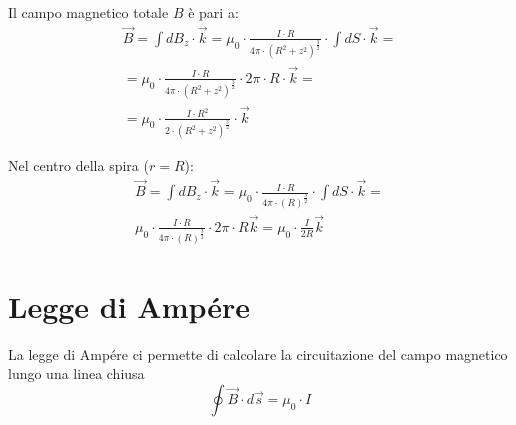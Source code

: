 Il campo magnetico totale $B$ è pari a:
\begin{displaymath}\begin{aligned}
	\vec{B} = \int dB_z \cdot \vec{k} =  \mu_0 \cdot \frac{I \cdot R}{4\pi \cdot (R^2 + z^2)^\frac{3}{2}} \cdot \int dS \cdot \vec{k} = \\
    = \mu_0 \cdot \frac{I \cdot R}{4\pi \cdot (R^2 + z^2)^\frac{3}{2}} \cdot 2 \pi \cdot R \cdot \vec{k} = \\
    =\mu_0 \cdot \frac{I \cdot R^2}{2 \cdot (R^2 + z^2)^\frac{3}{2}} \cdot \vec{k}
\end{aligned}\end{displaymath}

Nel centro della spira ($r=R$):
\begin{displaymath}\begin{aligned}
	\vec{B} = \int dB_z \cdot \vec{k} =  
	\mu_0 \cdot \frac{I \cdot R}{4\pi \cdot (R)^\frac{3}{2}} \cdot \int dS \cdot \vec{k} = \\
    \mu_0 \cdot \frac{I \cdot R}{4\pi \cdot (R)^\frac{3}{2}} \cdot 2 \pi \cdot R  \vec{k} = \mu_0 \cdot \frac{I}{2R} \vec{k}
\end{aligned}\end{displaymath}

\section{Legge di Ampére}
La legge di Ampére ci permette di calcolare la circuitazione del campo magnetico lungo una linea chiusa
\begin{displaymath}
	\oint \vec{B} \cdot d\vec{s} = \mu_0 \cdot I
\end{displaymath}

